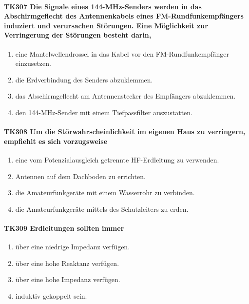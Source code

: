 \documentclass[8pt]{article}
\begin{document}
\paragraph*{TK307 Die Signale eines 144-MHz-Senders werden in das Abschirmgeflecht des Antennenkabels eines FM-Rundfunkempfängers induziert und verursachen Störungen. Eine Möglichkeit zur Verringerung der Störungen besteht darin,}
\begin{enumerate}[nolistsep,label=\Alph*]
\item eine Mantelwellendrossel in das Kabel vor den FM-Rundfunkempfänger einzusetzen.
\item die Erdverbindung des Senders abzuklemmen. 
\item das Abschirmgeflecht am Antennenstecker des Empfängers abzuklemmen.
\item den 144-MHz-Sender mit einem Tiefpassfilter auszustatten.
\end{enumerate}

\paragraph*{TK308 Um die Störwahrscheinlichkeit im eigenen Haus zu verringern, empfiehlt es sich vorzugsweise}
\begin{enumerate}[nolistsep,label=\Alph*]
\item eine vom Potenzialausgleich getrennte HF-Erdleitung zu verwenden.
\item Antennen auf dem Dachboden zu errichten.
\item die Amateurfunkgeräte mit einem Wasserrohr zu verbinden.
\item die Amateurfunkgeräte mittels des Schutzleiters zu erden.
\end{enumerate}

\paragraph*{TK309 Erdleitungen sollten immer}
\begin{enumerate}[nolistsep,label=\Alph*]
\item über eine niedrige Impedanz verfügen.
\item über eine hohe Reaktanz verfügen.
\item über eine hohe Impedanz verfügen.
\item induktiv gekoppelt sein.
\end{enumerate}
\end{document}
